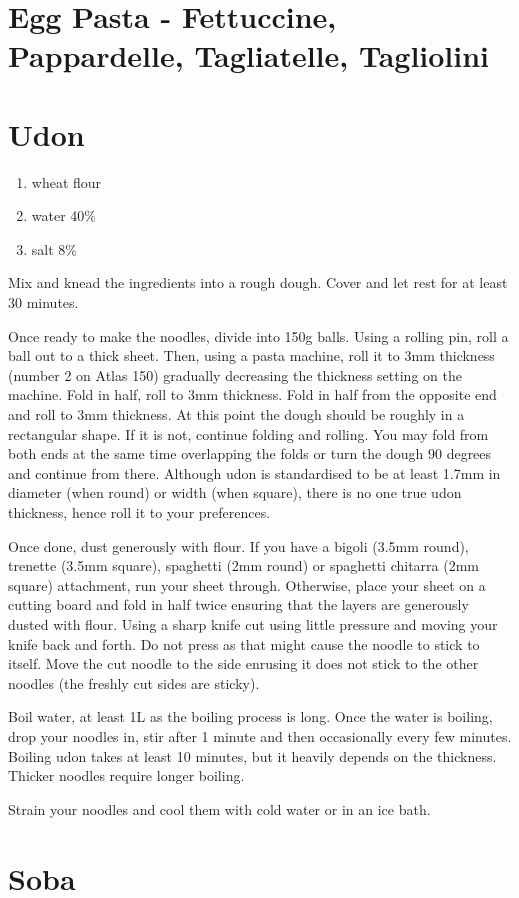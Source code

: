 \section{Egg Pasta - Fettuccine, Pappardelle, Tagliatelle, Tagliolini} \label{egg-pasta}

\section{Udon} \label{udon}
\begin{enumerate}
  \item wheat flour
  \item water 40\%
  \item salt 8\%
\end{enumerate}

Mix and knead the ingredients into a rough dough. Cover and let rest for at
least 30 minutes.

Once ready to make the noodles, divide into 150g balls. Using a rolling pin,
roll a ball out to a thick sheet. Then, using a pasta machine, roll it to 3mm
thickness (number 2 on Atlas 150) gradually decreasing the thickness setting on
the machine. Fold in half, roll to 3mm thickness. Fold in half from the
opposite end and roll to 3mm thickness. At this point the dough should be
roughly in a rectangular shape. If it is not, continue folding and rolling. You
may fold from both ends at the same time overlapping the folds or turn the
dough 90 degrees and continue from there. Although udon is standardised to be
at least 1.7mm in diameter (when round) or width (when square), there is no one
true udon thickness, hence roll it to your preferences.

Once done, dust generously with flour. If you have a bigoli (3.5mm round),
trenette (3.5mm square), spaghetti (2mm round) or spaghetti chitarra (2mm
square) attachment, run your sheet through. Otherwise, place your sheet on a
cutting board and fold in half twice ensuring that the layers are generously
dusted with flour. Using a sharp knife cut using little pressure and moving
your knife back and forth. Do not press as that might cause the noodle to stick
to itself. Move the cut noodle to the side enrusing it does not stick to the
other noodles (the freshly cut sides are sticky).

Boil water, at least 1L as the boiling process is long. Once the water is
boiling, drop your noodles in, stir after 1 minute and then occasionally every
few minutes. Boiling udon takes at least 10 minutes, but it heavily depends on
the thickness. Thicker noodles require longer boiling.

Strain your noodles and cool them with cold water or in an ice bath.

\section{Soba}
